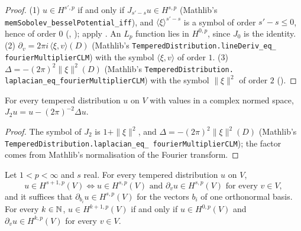 \begin{proof}
\leanok
(1) $u \in H^{s',p}$ if and only if $J_{s'-s} u \in H^{s,p}$ (Mathlib's
\texttt{memSobolev\_\allowbreak besselPotential\_\allowbreak iff}), and
$\langle \xi \rangle^{s'-s}$ is a symbol of order $s' - s \leq 0$, hence of order $0$
(, ); apply
. An $L_p$ function lies in $H^{0,p}$, since $J_0$ is the
identity. (2) $\partial_v = 2\pi i \, \langle \xi, v \rangle(D)$ (Mathlib's
\texttt{TemperedDistribution.\allowbreak lineDeriv\_\allowbreak eq\_\allowbreak
fourierMultiplierCLM}) with the symbol $\langle \xi, v \rangle$ of order $1$. (3)
$\Delta = -(2\pi)^2 \|\xi\|^2(D)$ (Mathlib's \texttt{TemperedDistribution.\allowbreak
laplacian\_\allowbreak eq\_\allowbreak fourierMultiplierCLM}) with the symbol $\|\xi\|^2$ of
order $2$ ().
\end{proof}

\begin{lemma}[$J_2 = 1 - (2\pi)^{-2} \Delta$]
\label{lem:bessel-two-laplacian}
\leanok
For every tempered distribution $u$ on $V$ with values in a complex normed space,
$J_2 u = u - (2\pi)^{-2} \Delta u$.
\end{lemma}

\begin{proof}
\leanok
The symbol of $J_2$ is $1 + \|\xi\|^2$, and $\Delta = -(2\pi)^2 \|\xi\|^2(D)$ (Mathlib's
\texttt{TemperedDistribution.\allowbreak laplacian\_\allowbreak eq\_\allowbreak
fourierMultiplierCLM}); the factor comes from Mathlib's normalisation of the Fourier transform.
\end{proof}

\begin{theorem}
\label{thm:bessel-potential-derivatives}
\leanok
{}
Let $1 < p < \infty$ and $s$ real. For every tempered distribution $u$ on $V$,
\[
  u \in H^{s+1,p}(V) \iff u \in H^{s,p}(V) \text{ and } \partial_v u \in H^{s,p}(V)
  \text{ for every } v \in V ,
\]
and it suffices that $\partial_{b_i} u \in H^{s,p}(V)$ for the vectors $b_i$ of one orthonormal
basis. For every $k \in \mathbb{N}$, $u \in H^{k+1,p}(V)$ if and only if $u \in H^{0,p}(V)$ and
$\partial_v u \in H^{k,p}(V)$ for every $v \in V$.
\end{theorem}

